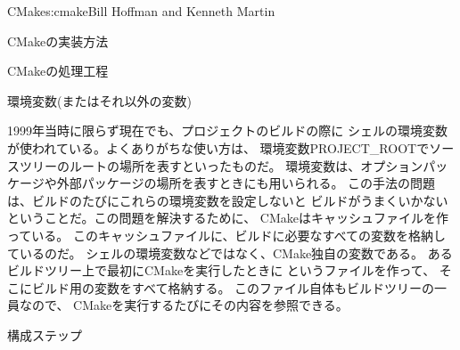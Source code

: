 \begin{aosachapter}{CMake}{s:cmake}{Bill Hoffman and Kenneth Martin}
\begin{aosasect1}{CMakeの実装方法}
\begin{aosasect2}{CMakeの処理工程}
\begin{aosasect3}{環境変数(またはそれ以外の変数)}

1999年当時に限らず現在でも、プロジェクトのビルドの際に
シェルの環境変数が使われている。よくありがちな使い方は、
環境変数PROJECT\_ROOTでソースツリーのルートの場所を表すといったものだ。
環境変数は、オプションパッケージや外部パッケージの場所を表すときにも用いられる。
この手法の問題は、ビルドのたびにこれらの環境変数を設定しないと
ビルドがうまくいかないということだ。この問題を解決するために、
CMakeはキャッシュファイルを作っている。
このキャッシュファイルに、ビルドに必要なすべての変数を格納しているのだ。
シェルの環境変数などではなく、CMake独自の変数である。
あるビルドツリー上で最初にCMakeを実行したときに
というファイルを作って、
そこにビルド用の変数をすべて格納する。
このファイル自体もビルドツリーの一員なので、
CMakeを実行するたびにその内容を参照できる。

\end{aosasect3}

\begin{aosasect3}{構成ステップ}


\end{aosasect3}
\end{aosasect2}
\end{aosasect1}
\end{aosachapter}
